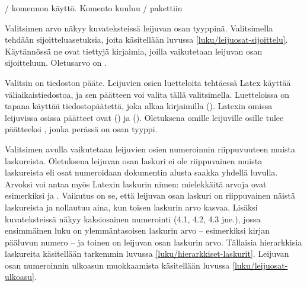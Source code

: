 
\begin{esimerkki*}

\begin{koodilohko}
\end{koodilohko}

\caption{\-/ komennon käyttö. Komento
  kuuluu \-/ pakettiin}
\label{esim/declarenewfloat}
\end{esimerkki*}

Valitsimen  arvo näkyy kuvateksteissä leijuvan osan
tyyppinä. Valitsimella  tehdään sijoitteluasetuksia,
joita käsitellään luvussa \ref{luku/leijuosat-sijoittelu}. Käytännössä
ne ovat tiettyjä kirjaimia, joilla vaikutetaan leijuvan osan
sijoitteluun. Oletusarvo on .

Valitsin  on tiedoston pääte. Leijuvien osien
luetteloita tehtäessä Latex käyttää väliaikaistiedostoa, ja sen päätteen
voi valita tällä valitsimella. Luetteloissa on tapana käyttää
tiedostopäätettä, joka alkaa kirjaimilla  (). Latexin omissa leijuvissa osissa päätteet ovat 
() ja  (). Oletuksena omille leijuville osille tulee päätteeksi
, jonka perässä on osan tyyppi.

Valitsimen  avulla vaikutetaan leijuvien osien numeroinnin
riippuvuuteen muista laskureista. Oletuksena leijuvan osan laskuri ei
ole riippuvainen muista laskureista eli osat numeroidaan dokumentin
alusta saakka yhdellä luvulla. Arvoksi voi antaa myös Latexin laskurin
nimen: mielekkäitä arvoja ovat esimerkiksi  ja
. Vaikutus on se, että leijuvan osan laskuri on
riippuvainen näistä laskureista ja nollautuu aina, kun toisen laskurin
arvo kasvaa. Lisäksi kuvateksteissä näkyy kaksiosainen numerointi (4.1,
4.2, 4.3 jne.), jossa ensimmäinen luku on ylemmäntasoisen laskurin arvo
-- esimerkiksi kirjan pääluvun numero -- ja toinen on leijuvan osan
laskurin arvo. Tällaisia hierarkkisia laskureita käsitellään tarkemmin
luvussa \ref{luku/hierarkkiset-laskurit}. Leijuvan osan numeroinnin
ulkoasun muokkaamista käsitellään luvussa \ref{luku/leijuosat-ulkoasu}.

